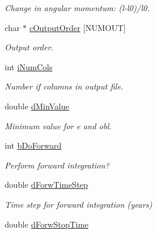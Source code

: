 \begin{DoxyCompactItemize}
\begin{DoxyCompactList}\small\item\em Change in angular momentum\+: (l-\/l0)/l0. \end{DoxyCompactList}\item 
\hypertarget{struct_p_a_r_a_m_a0aedd704f2d03f9137f873848decb0e7}{}char $\ast$ \hyperlink{struct_p_a_r_a_m_a0aedd704f2d03f9137f873848decb0e7}{c\+Output\+Order} \mbox{[}N\+U\+M\+O\+U\+T\mbox{]}\label{struct_p_a_r_a_m_a0aedd704f2d03f9137f873848decb0e7}

\begin{DoxyCompactList}\small\item\em Output order. \end{DoxyCompactList}\item 
\hypertarget{struct_p_a_r_a_m_ad94617a6ec1d70996467c7fdb3ff4dcb}{}int \hyperlink{struct_p_a_r_a_m_ad94617a6ec1d70996467c7fdb3ff4dcb}{i\+Num\+Cols}\label{struct_p_a_r_a_m_ad94617a6ec1d70996467c7fdb3ff4dcb}

\begin{DoxyCompactList}\small\item\em Number if columns in output file. \end{DoxyCompactList}\item 
\hypertarget{struct_p_a_r_a_m_a1b501cc9cb0d29c99eecfe9a3631458a}{}double \hyperlink{struct_p_a_r_a_m_a1b501cc9cb0d29c99eecfe9a3631458a}{d\+Min\+Value}\label{struct_p_a_r_a_m_a1b501cc9cb0d29c99eecfe9a3631458a}

\begin{DoxyCompactList}\small\item\em Minimum value for e and obl. \end{DoxyCompactList}\item 
\hypertarget{struct_p_a_r_a_m_a9a3f244cea9164a5daf886a76dc3f598}{}int \hyperlink{struct_p_a_r_a_m_a9a3f244cea9164a5daf886a76dc3f598}{b\+Do\+Forward}\label{struct_p_a_r_a_m_a9a3f244cea9164a5daf886a76dc3f598}

\begin{DoxyCompactList}\small\item\em Perform forward integration? \end{DoxyCompactList}\item 
\hypertarget{struct_p_a_r_a_m_ac0cbf12d21e100bd1a1c589298320499}{}double \hyperlink{struct_p_a_r_a_m_ac0cbf12d21e100bd1a1c589298320499}{d\+Forw\+Time\+Step}\label{struct_p_a_r_a_m_ac0cbf12d21e100bd1a1c589298320499}

\begin{DoxyCompactList}\small\item\em Time step for forward integration (years) \end{DoxyCompactList}\item 
\hypertarget{struct_p_a_r_a_m_ac1908f1a4940c61abc59ce64c8277f4b}{}double \hyperlink{struct_p_a_r_a_m_ac1908f1a4940c61abc59ce64c8277f4b}{d\+Forw\+Stop\+Time}\label{struct_p_a_r_a_m_ac1908f1a4940c61abc59ce64c8277f4b}


\end{DoxyCompactItemize}
